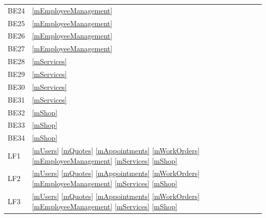 \documentclass[12pt, titlepage]{article}
\begin{document}
\begin{longtable}{p{} p{}}
	BE24                  & \ref{mEmployeeManagement}                                                                                              \\
	BE25                  & \ref{mEmployeeManagement}                                                                                              \\
	BE26                  & \ref{mEmployeeManagement}                                                                                              \\
	BE27                  & \ref{mEmployeeManagement}                                                                                              \\
	BE28                  & \ref{mServices}                                                                                                        \\
	BE29                  & \ref{mServices}                                                                                                        \\
	BE30                  & \ref{mServices}                                                                                                        \\
	BE31                  & \ref{mServices}                                                                                                        \\
	BE32                  & \ref{mShop}                                                                                                            \\
	BE33                  & \ref{mShop}                                                                                                            \\
	BE34                  & \ref{mShop}                                                                                                            \\
	LF1                   & \ref{mUsers} \ref{mQuotes} \ref{mAppointments} \ref{mWorkOrders} \ref{mEmployeeManagement} \ref{mServices} \ref{mShop} \\
	LF2                   & \ref{mUsers} \ref{mQuotes} \ref{mAppointments} \ref{mWorkOrders} \ref{mEmployeeManagement} \ref{mServices} \ref{mShop} \\
	LF3                   & \ref{mUsers} \ref{mQuotes} \ref{mAppointments} \ref{mWorkOrders} \ref{mEmployeeManagement} \ref{mServices} \ref{mShop} \\

\end{longtable}
\end{document}
